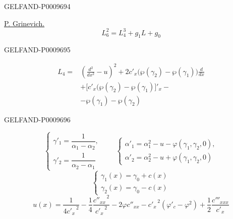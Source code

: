 \begin{GelfandAdjacentEvidence}{GELFAND-P000969}{4}


\underline{P. Grinevich.}
\begin{equation*}
 L_6^2=L_4^3+g_1L+g_0\tag{1}
\end{equation*}
\end{GelfandAdjacentEvidence}
\begin{GelfandAdjacentEvidence}{GELFAND-P000969}{5}

\begin{equation*}
\begin{aligned}
 L_4={}&\left(\frac{d^2}{dx^2}-u\right)^2
 +2c'_x\bigl(\wp(\gamma_2)-\wp(\gamma_1)\bigr)\frac{d}{dx}\\
 &+\bigl[c'_x(\wp(\gamma_2)-\wp(\gamma_1)\bigr]'_x-\\
 &-\wp(\gamma_1)-\wp(\gamma_2)
\end{aligned}\tag{2}
\end{equation*}
\end{GelfandAdjacentEvidence}
\begin{GelfandAdjacentEvidence}{GELFAND-P000969}{6}

\end{GelfandAdjacentEvidence}

\begin{equation*}
 \begin{cases}
 \gamma'_1=\dfrac{1}{\alpha_1-\alpha_2},\\[.4em]
 \gamma'_2=\dfrac{1}{\alpha_2-\alpha_1}
 \end{cases}
 \qquad
 \begin{cases}
 \alpha'_1=\alpha_1^2-u-\varphi(\gamma_1,\gamma_2,0),\\
 \alpha'_2=\alpha_2^2-u+\varphi(\gamma_1,\gamma_2,0)
 \end{cases}\tag{3}
\end{equation*}
\[
 \begin{cases}
 \gamma_1(x)=\gamma_0+c(x)\\
 \gamma_2(x)=\gamma_0-c(x)
 \end{cases}
\]
\[
 u(x)=\frac{1}{4{c'_x}^{\,2}}
 -\frac14\frac{{c''_{xx}}^{\,2}}{{c'_x}^{\,2}}
 -2\varphi c''_{xx}
 -{c'_x}^{\,2}(\varphi'_c-\varphi^2)
 +\frac12\frac{c'''_{xxx}}{c'_x}
\]

